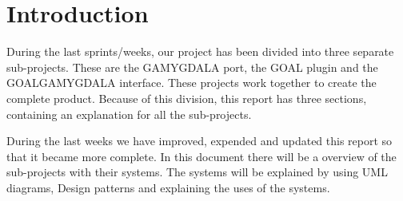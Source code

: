 \section{Introduction} 
During the last sprints/weeks, our project has been divided into three separate sub-projects. These are the GAMYGDALA port, the GOAL plugin and the GOALGAMYGDALA interface. These projects work together to create the complete product. Because of this division, this report has three sections, containing an explanation for all the sub-projects.

During the last weeks we have improved, expended and updated this report so that it became more complete. In this document there will be a overview of the sub-projects with their systems. The systems will be explained by using UML diagrams, Design patterns and explaining the uses of the systems.